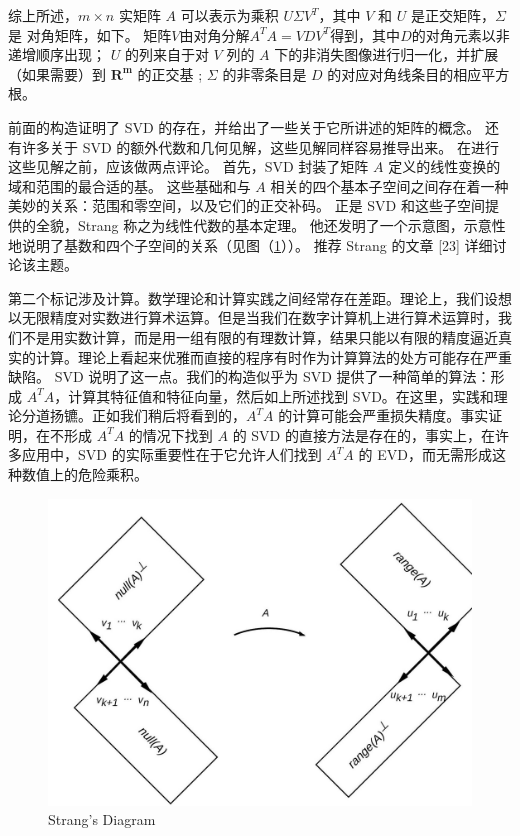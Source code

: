 \documentclass[11pt,a4paper,twoside]{article}
\begin{document}
\begin{CJK}{UTF8}{gbsn}
综上所述，$m \times n$ 实矩阵 $A$ 可以表示为乘积 $U \Sigma V^{T}$，其中 $V$ 和 $U$ 是正交矩阵，$\Sigma$ 是 对角矩阵，如下。 矩阵$V$由对角分解$A^{T} A=V D V^{T}$得到，其中$D$的对角元素以非递增顺序出现； $U$ 的列来自于对 $V$ 列的 $A$ 下的非消失图像进行归一化，并扩展（如果需要）到 $\mathbf{R}^{\mathbf{m}}$ 的正交基 ; $\Sigma$ 的非零条目是 $D$ 的对应对角线条目的相应平方根。

前面的构造证明了 SVD 的存在，并给出了一些关于它所讲述的矩阵的概念。 还有许多关于 SVD 的额外代数和几何见解，这些见解同样容易推导出来。 在进行这些见解之前，应该做两点评论。 首先，SVD 封装了矩阵 $A$ 定义的线性变换的域和范围的最合适的基。 这些基础和与 $A$ 相关的四个基本子空间之间存在着一种美妙的关系：范围和零空间，以及它们的正交补码。 正是 SVD 和这些子空间提供的全貌，Strang 称之为线性代数的基本定理。 他还发明了一个示意图，示意性地说明了基数和四个子空间的关系（见图（\ref{fig:1}））。 推荐 Strang 的文章 [23] 详细讨论该主题。

第二个标记涉及计算。数学理论和计算实践之间经常存在差距。理论上，我们设想以无限精度对实数进行算术运算。但是当我们在数字计算机上进行算术运算时，我们不是用实数计算，而是用一组有限的有理数计算，结果只能以有限的精度逼近真实的计算。理论上看起来优雅而直接的程序有时作为计算算法的处方可能存在严重缺陷。 SVD 说明了这一点。我们的构造似乎为 SVD 提供了一种简单的算法：形成 $A^{T} A$，计算其特征值和特征向量，然后如上所述找到 SVD。在这里，实践和理论分道扬镳。正如我们稍后将看到的，$A^{T}A$ 的计算可能会严重损失精度。事实证明，在不形成 $A^{T} A$ 的情况下找到 $A$ 的 SVD 的直接方法是存在的，事实上，在许多应用中，SVD 的实际重要性在于它允许人们找到 $A^{T} A$ 的 EVD，而无需形成这种数值上的危险乘积。

\begin{figure}[htbp]%
  \centering
  \includegraphics[totalheight=4in]{./fig/1.jpg}
  \caption{Strang's Diagram} 
  \label{fig:1}
\end{figure}


\end{CJK}
\end{document}
